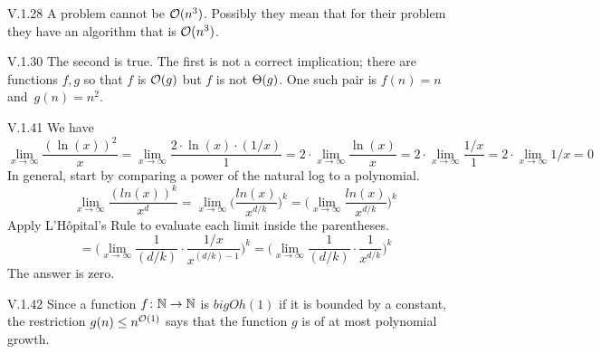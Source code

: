 %
\begin{ans}{V.1.28}
A problem cannot be $\operatorname*{\mathcal{O}}(n^3)$.
Possibly they mean that for their problem they have an algorithm that is
$\operatorname*{\mathcal{O}}(n^3)$.
\end{ans}
%
%
\begin{ans}{V.1.30}
  The second is true.
  The first is not a correct implication; there are functions
  $f,g$ so that $f$ is $\operatorname*{\mathcal{O}}(g)$ but $f$ is not $\Theta(g)$.
  One such pair is $f(n)=n$ and~$g(n)=n^2$.
  
\end{ans}
%
%
%
%
%
%
%
%
%
%
%
\begin{ans}{V.1.41}
  We have
  \begin{equation*}
    \lim_{x\to\infty}\frac{(\ln(x))^2}{x}
    =\lim_{x\to\infty}\frac{2\cdot\ln(x)\cdot (1/x)}{1}
    =2\cdot\lim_{x\to\infty}\frac{\ln(x)}{x}
    =2\cdot\lim_{x\to\infty}\frac{1/x}{1}
    =2\cdot\lim_{x\to\infty}1/x
    =0
  \end{equation*}
  In general, start by comparing a power of the natural log to a polynomial.
  \begin{equation*}
    \lim_{x\to\infty}\frac{(ln(x))^k}{x^d}
    =\lim_{x\to\infty}\big(\frac{ln(x)}{x^{d/k}}\big)^k
    =\bigg(\lim_{x\to\infty}\frac{ln(x)}{x^{d/k}}\bigg)^k
  \end{equation*}
  Apply L'H\^{o}pital's Rule to evaluate each limit inside the parentheses.
  \begin{equation*}
    =\bigg(\lim_{x\to\infty}\frac{1}{(d/k)}\cdot\frac{1/x}{x^{(d/k)-1}}\bigg)^k
    =\bigg(\lim_{x\to\infty}\frac{1}{(d/k)}\cdot\frac{1}{x^{d/k}}\bigg)^k
  \end{equation*}
  The answer is zero.
  
\end{ans}
%
\begin{ans}{V.1.42}
 Since a function $\mbox{$f\colon \mathbb{N}\to \mathbb{N}$}$ is $bigOh(1)$ if it is bounded by
 a constant, the restriction $g(n)\leq n^{\operatorname*{\mathcal{O}}(1)}$ says that the function
 $g$ is of at most polynomial growth.
 
\end{ans}
